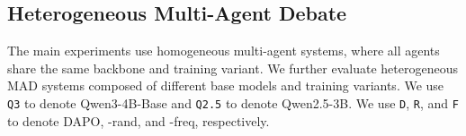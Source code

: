 \begin{table}[t]
  \caption{Agent-level transition statistics after one debate round on Qwen3-4B-Base. Correct$\to$Incorrect measures harmful revisions, while Incorrect$\to$Correct measures useful revisions. $\delta$ is defined as Incorrect$\to$Correct minus Correct$\to$Incorrect. Best results are bolded within each benchmark.}
  \label{tab:app-transition}
  \begin{center}
  \end{center}
  \vskip -0.1in
\end{table}


\subsection{Heterogeneous Multi-Agent Debate}
\label{app:heterogeneous_mad}

The main experiments use homogeneous multi-agent systems, where all agents share the same backbone and training variant. We further evaluate heterogeneous MAD systems composed of different base models and training variants. We use \texttt{Q3} to denote Qwen3-4B-Base and \texttt{Q2.5} to denote Qwen2.5-3B. We use \texttt{D}, \texttt{R}, and \texttt{F} to denote DAPO, \SDRL{}-rand, and \SDRL{}-freq, respectively.

